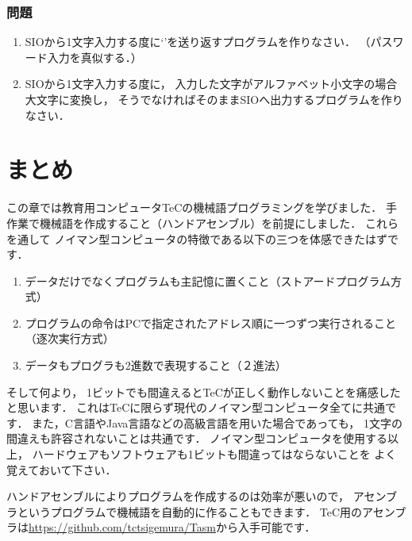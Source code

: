 \vfill
\subsubsection{問題}
\begin{enumerate}
\item SIOから1文字入力する度に`{\tt *}'を送り返すプログラムを作りなさい．
（パスワード入力を真似する．）
\item
SIOから1文字入力する度に，
入力した文字がアルファベット小文字の場合大文字に変換し，
そうでなければそのままSIOへ出力するプログラムを作りなさい．
\end{enumerate}
\vfill

\section{まとめ}

この章では教育用コンピュータTeCの機械語プログラミングを学びました．
手作業で機械語を作成すること（ハンドアセンブル）を前提にしました．
これらを通して
ノイマン型コンピュータの特徴である以下の三つを体感できたはずです．

\begin{enumerate}
\item データだけでなくプログラムも主記憶に置くこと（ストアードプログラム方式）
\item プログラムの命令はPCで指定されたアドレス順に一つずつ実行されること
（逐次実行方式）
\item データもプログラも2進数で表現すること（２進法）
\end{enumerate}

そして何より，
1ビットでも間違えるとTeCが正しく動作しないことを痛感したと思います．
これはTeCに限らず現代のノイマン型コンピュータ全てに共通です．
また，C言語やJava言語などの高級言語を用いた場合であっても，
1文字の間違えも許容されないことは共通です．
ノイマン型コンピュータを使用する以上，
ハードウェアもソフトウェアも1ビットも間違ってはならないことを
よく覚えておいて下さい．

ハンドアセンブルによりプログラムを作成するのは効率が悪いので，
アセンブラというプログラムで機械語を自動的に作ることもできます．
TeC用のアセンブラは\url{https://github.com/tctsigemura/Tasm}から入手可能です．
